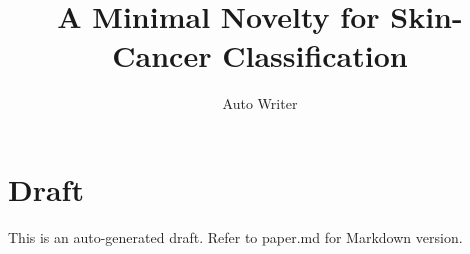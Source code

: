 \documentclass[11pt]{article}
\title{A Minimal Novelty for Skin-Cancer Classification}
\author{Auto Writer}
\date{}
\begin{document}
\maketitle
\section*{Draft}
This is an auto-generated draft. Refer to paper.md for Markdown version.

    
    \nocite{*}
    
    
    
\end{document}
